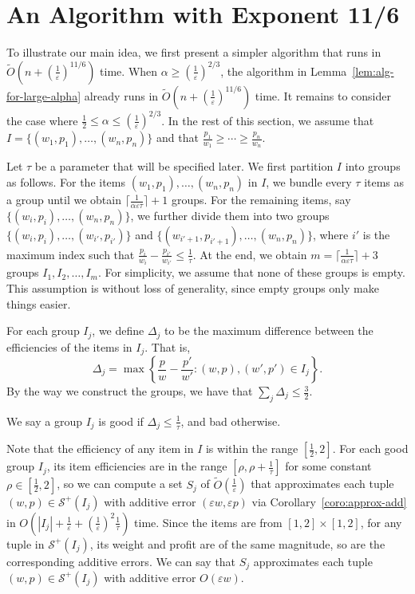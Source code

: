 \documentclass[a4paper,UKenglish,cleveref, autoref, thm-restate, pdfa]{lipics-v2021}
\newcommand{\eps}{\varepsilon}
\renewcommand{\leq}{\leqslant}
\renewcommand{\geq}{\geqslant}
\begin{document}
\section{An Algorithm with Exponent 11/6}\label{sec:weak}
To illustrate our main idea, we first present a simpler algorithm that runs in $\tilde{O}(n + (\frac{1}{\eps})^{11/6})$ time.  When $\alpha \geq (\frac{1}{\eps})^{2/3}$, the algorithm in Lemma~\ref{lem:alg-for-large-alpha} already runs in $\tilde{O}(n + (\frac{1}{\eps})^{11/6})$ time. It remains to consider the case where $\frac{1}{2}\leq \alpha \leq (\frac{1}{\eps})^{2/3}$. In the rest of this section, we assume that $I = \{(w_1, p_1), \ldots, (w_n, p_n)\}$ and that $\frac{p_1}{w_1} \geq \cdots \geq \frac{p_n}{w_n}$.

Let $\tau$ be a parameter that will be specified later.  We first partition $I$ into groups as follows. For the items $(w_1, p_1), \ldots, (w_n, p_n)$ in $I$, we bundle every $\tau$ items as a group until we obtain $\lceil\frac{1}{\alpha\eps\tau}\rceil + 1$ groups. For the remaining items, say $\{(w_i, p_i), \ldots, (w_n, p_n)\}$, we further divide them into two groups $\{(w_i, p_i), \ldots, (w_{i'}, p_{i'})\}$ and $\{(w_{i'+ 1}, p_{i'+1}), \ldots, (w_n, p_n)\}$, where $i'$ is the maximum index such that $\frac{p_i}{w_i} - \frac{p_{i'}}{w_{i'}} \leq \frac{1}{\tau}$. At the end, we obtain $m = \lceil\frac{1}{\alpha\eps\tau}\rceil + 3$ groups $I_1, I_2, \ldots, I_m$. For simplicity, we assume that none of these groups is empty. This assumption is without loss of generality, since empty groups only make things easier.

For each group $I_j$, we define $\Delta_j$ to be the maximum difference between the efficiencies of the items in $I_j$. That is,
\[
    \Delta_j = \max\left\{\frac{p}{w} - \frac{p'}{w'} : (w, p), (w', p') \in I_j\right\}. 
\]
By the way we construct the groups, we have that $\sum_j \Delta_j \leq \frac{3}{2}$.  

We say a group $I_j$ is good if $\Delta_j \leq \frac{1}{\tau}$, and bad otherwise. 

Note that the efficiency of any item in $I$ is within the range $[\frac{1}{2}, 2]$. For each good group $I_j$, its item efficiencies are in the range $[\rho, \rho + \frac{1}{\tau}]$ for some constant $\rho \in [\frac{1}{2},2]$, so we can compute a set $S_j$ of $\tilde{O}(\frac{1}{\eps})$ that approximates each tuple $(w, p) \in \mathcal{S}^+(I_j)$ with additive error $(\eps w, \eps p)$ via Corollary~\ref{coro:approx-add} in $O(|I_j| + \frac{1}{\eps} + (\frac{1}{\eps})^2\frac{1}{\tau})$ time. Since the items are from $[1,2]\times [1,2]$, for any tuple in $\mathcal{S}^+(I_j)$, its weight and profit are of the same magnitude, so are the corresponding additive errors. We can say that $S_j$ approximates each tuple $(w, p) \in \mathcal{S}^+(I_j)$ with additive error $O(\eps w)$.
\end{document}
